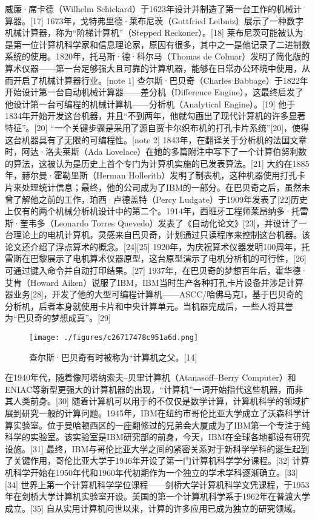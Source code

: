 威廉·席卡德（Wilhelm Schickard）于1623年设计并制造了第一台工作的机械计算器。[17] 1673年，戈特弗里德·莱布尼茨（Gottfried Leibniz）展示了一种数字机械计算器，称为“阶梯计算机”（Stepped Reckoner）。[18] 莱布尼茨可能被认为是第一位计算机科学家和信息理论家，原因有很多，其中之一是他记录了二进制数系统的使用。1820年，托马斯·德·科尔马（Thomas de Colmar）发明了简化版的算术仪器——第一台足够强大且可靠的计算机器，能够在日常办公环境中使用，从而开启了机械计算器行业。[note 1] 查尔斯·巴贝奇（Charles Babbage）于1822年开始设计第一台自动机械计算器——差分机（Difference Engine），这最终启发了他设计第一台可编程的机械计算机——分析机（Analytical Engine）。[19] 他于1834年开始开发这台机器，并且“不到两年，他就勾画出了现代计算机的许多显著特征”。[20] “一个关键步骤是采用了源自贾卡尔织布机的打孔卡片系统”[20]，使得这台机器具有了无限的可编程性。[note 2] 1843年，在翻译关于分析机的法国文章时，阿达·洛夫莱斯（Ada Lovelace）在她的多篇附注中写下了一个计算伯努利数的算法，这被认为是历史上首个专门为计算机实施的已发表算法。[21] 大约在1885年，赫尔曼·霍勒里斯（Herman Hollerith）发明了制表机，这种机器使用打孔卡片来处理统计信息；最终，他的公司成为了IBM的一部分。在巴贝奇之后，虽然未曾了解他之前的工作，珀西·卢德盖特（Percy Ludgate）于1909年发表了[22]历史上仅有的两个机械分析机设计中的第二个。1914年，西班牙工程师莱昂纳多·托雷斯·奎韦多（Leonardo Torres Quevedo）发表了《自动化论文》[23]，并设计了一台理论上的电机计算机，灵感来自巴贝奇，计划通过只读程序来控制这台机器。该论文还介绍了浮点算术的概念。[24][25] 1920年，为庆祝算术仪器发明100周年，托雷斯在巴黎展示了电机算术仪器原型，这台原型演示了电机分析机的可行性，[26] 可通过键入命令并自动打印结果。[27] 1937年，在巴贝奇的梦想百年后，霍华德·艾肯（Howard Aiken）说服了IBM，IBM当时生产各种打孔卡片设备并涉足计算器业务[28]，开发了他的大型可编程计算机——ASCC/哈佛马克I，基于巴贝奇的分析机，后者本身就使用卡片和中央计算单元。当机器完成后，一些人将其誉为“巴贝奇的梦想成真”。[29]
\begin{figure}[ht]
\centering
\texttt{[image: ./figures/c26717478c951a6d.png]}
\caption{查尔斯·巴贝奇有时被称为“计算机之父。[14]} \label{fig_JSS_2}
\end{figure}
在1940年代，随着像阿塔纳索夫–贝里计算机（Atanasoff–Berry Computer）和ENIAC等新型更强大的计算机器的出现，“计算机”一词开始指代这些机器，而非其人类前身。[30] 随着计算机可以用于的不仅仅是数学计算，计算机科学的领域扩展到研究一般的计算问题。1945年，IBM在纽约市哥伦比亚大学成立了沃森科学计算实验室。位于曼哈顿西区的一座翻修过的兄弟会大厦成为了IBM第一个专注于纯科学的实验室。该实验室是IBM研究部的前身，今天，IBM在全球各地都设有研究设施。[31] 最终，IBM与哥伦比亚大学之间的紧密关系对于新科学学科的诞生起到了关键作用，哥伦比亚大学于1946年开设了第一门计算机科学学分课程。[32] 计算机科学开始在1950年代和1960年代初期作为一个独立的学术学科逐渐确立。[33][34] 世界上第一个计算机科学学位课程——剑桥大学计算机科学文凭课程，于1953年在剑桥大学计算机实验室开设。美国的第一个计算机科学系于1962年在普渡大学成立。[35] 自从实用计算机问世以来，计算的许多应用已成为独立的研究领域。
